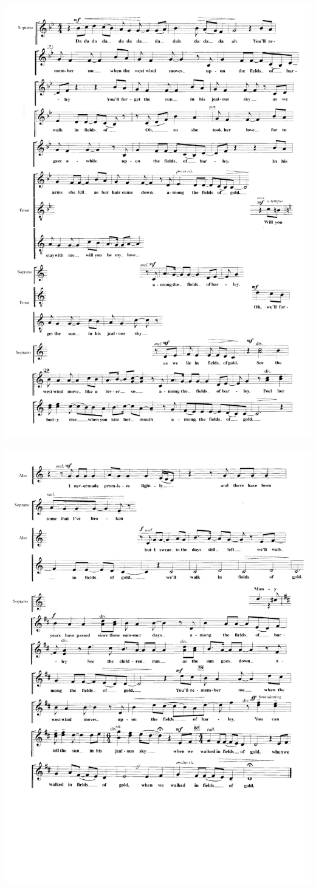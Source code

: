 \includegraphics[width=\textwidth]{resources/arrangements/Fields of Gold - Melody 01.png}

\includegraphics[width=\textwidth]{resources/arrangements/Fields of Gold - Melody 02.png}
